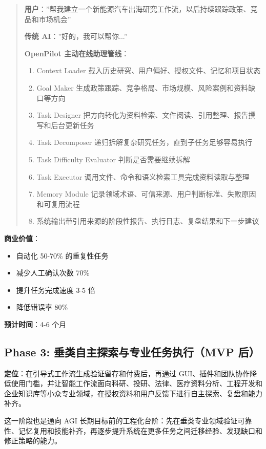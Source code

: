 \documentclass[12pt,a4paper]{ctexart}
\begin{document}
\begin{quote}
\textbf{用户}：”帮我建立一个新能源汽车出海研究工作流，以后持续跟踪政策、竞品和市场机会”

\textbf{传统 AI}：”好的，我可以帮你...”

\textbf{OpenPilot 主动在线助理管线}：
\begin{enumerate}
  \item Context Loader 载入历史研究、用户偏好、授权文件、记忆和项目状态
  \item Goal Maker 生成政策跟踪、竞争格局、市场规模、风险案例和资料缺口等方向
  \item Task Designer 把方向转化为资料检索、文件阅读、引用整理、报告撰写和后台更新任务
  \item Task Decomposer 递归拆解复杂研究任务，直到子任务足够容易执行
  \item Task Difficulty Evaluator 判断是否需要继续拆解
  \item Task Executor 调用文件、命令和语义检索工具完成资料读取与整理
  \item Memory Module 记录领域术语、可信来源、用户判断标准、失败原因和可复用流程
  \item 系统输出带引用来源的阶段性报告、执行日志、复盘结果和下一步建议
\end{enumerate}
\end{quote}

\textbf{商业价值}：
\begin{itemize}
  \item 自动化 50-70\% 的重复性任务
  \item 减少人工确认次数 70\%
  \item 提升任务完成速度 3-5 倍
  \item 降低错误率 80\%
\end{itemize}

\textbf{预计时间}：4-6 个月

\subsection{Phase 3: 垂类自主探索与专业任务执行（MVP 后）}

\textbf{定位}：在引导式工作流生成验证留存和付费后，再通过 GUI、插件和团队协作降低使用门槛，并让智能工作流面向科研、投研、法律、医疗资料分析、工程开发和企业知识库等小众专业领域，在授权资料和用户反馈下进行自主探索、复盘和能力补齐。

这一阶段也是通向 AGI 长期目标前的工程化台阶：先在垂类专业领域验证可靠性、记忆复用和技能补齐，再逐步提升系统在更多任务之间迁移经验、发现缺口和修正策略的能力。
\end{document}
